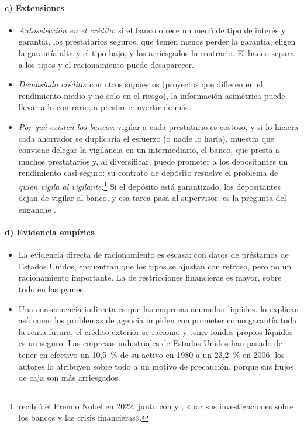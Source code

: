 \documentclass[11pt]{article}
\begin{document}
\paragraph{c) Extensiones}

\begin{itemize}
\item \emph{Autoselección en el crédito}: si el banco ofrece un menú de tipo de interés y garantía, los prestatarios seguros, que temen menos perder la garantía, eligen la garantía alta y el tipo bajo, y los arriesgados lo contrario. El banco separa a los tipos y el racionamiento puede desaparecer\nocite{Bester1985Screening}.
\item \emph{Demasiado crédito}: con otros supuestos (proyectos que difieren en el rendimiento medio y no solo en el riesgo), la información asimétrica puede llevar a lo contrario, a prestar e invertir de más\nocite{DeMezaWebb1987Too}.
\item \emph{Por qué existen los bancos}: vigilar a cada prestatario es costoso, y si lo hiciera cada ahorrador se duplicaría el esfuerzo (o nadie lo haría). \textcite{Diamond1984Financial} muestra que conviene delegar la vigilancia en un intermediario, el banco, que presta a muchos prestatarios y, al diversificar, puede prometer a los depositantes un rendimiento casi seguro: su contrato de depósito resuelve el problema de \emph{quién vigila al vigilante}.\footnote{ recibió el Premio Nobel en 2022, junto con  y , «por sus investigaciones sobre los bancos y las crisis financieras»\nocite{Nobel2022Bancos}.} Si el depósito está garantizado, los depositantes dejan de vigilar al banco, y esa tarea pasa al supervisor: es la pregunta del enganche  .
\end{itemize}

\paragraph{d) Evidencia empírica}

\begin{itemize}
\item La evidencia directa de racionamiento es escasa: con datos de préstamos de Estados Unidos, \textcite{BergerUdell1992Some} encuentran que los tipos se ajustan con retraso, pero no un racionamiento importante. La de restricciones financieras es mayor, sobre todo en las pymes.
\item Una consecuencia indirecta es que las empresas acumulan liquidez. \textcite{HolmstromTirole1998Private} lo explican así: como los problemas de agencia impiden comprometer como garantía toda la renta futura, el crédito exterior se raciona, y tener fondos propios líquidos es un seguro. Las empresas industriales de Estados Unidos han pasado de tener en efectivo un 10,5~\% de su activo en 1980 a un 23,2~\% en 2006\nocite{BatesKahleStulz2009Why}; los autores lo atribuyen sobre todo a un motivo de precaución, porque sus flujos de caja son más arriesgados.
\end{itemize}
\end{document}
